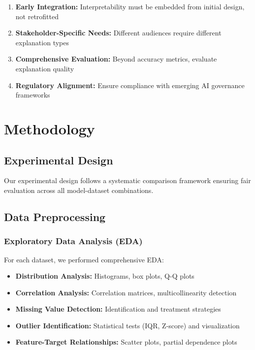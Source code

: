 \documentclass[11pt,a4paper]{article}
\begin{document}
\begin{enumerate}
    \item \textbf{Early Integration:} Interpretability must be embedded from initial design, not retrofitted
    \item \textbf{Stakeholder-Specific Needs:} Different audiences require different explanation types
    \item \textbf{Comprehensive Evaluation:} Beyond accuracy metrics, evaluate explanation quality
    \item \textbf{Regulatory Alignment:} Ensure compliance with emerging AI governance frameworks
\end{enumerate}

\section{Methodology}

\subsection{Experimental Design}

Our experimental design follows a systematic comparison framework ensuring fair evaluation across all model-dataset combinations.

\subsection{Data Preprocessing}

\subsubsection{Exploratory Data Analysis (EDA)}

For each dataset, we performed comprehensive EDA:

\begin{itemize}
    \item \textbf{Distribution Analysis:} Histograms, box plots, Q-Q plots
    \item \textbf{Correlation Analysis:} Correlation matrices, multicollinearity detection
    \item \textbf{Missing Value Detection:} Identification and treatment strategies
    \item \textbf{Outlier Identification:} Statistical tests (IQR, Z-score) and visualization
    \item \textbf{Feature-Target Relationships:} Scatter plots, partial dependence plots
\end{itemize}
\end{document}
